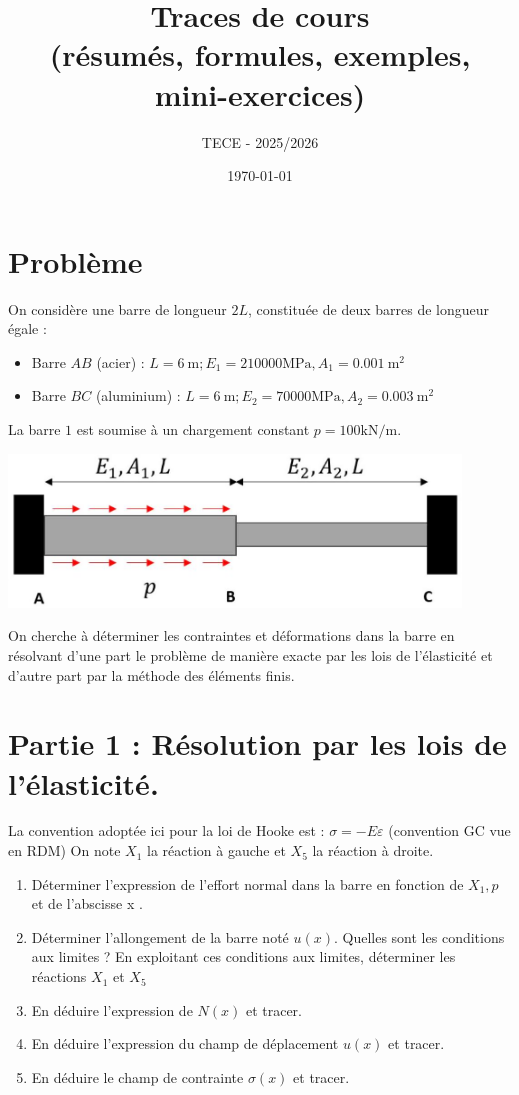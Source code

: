 \documentclass[11pt,a4paper]{report}
\title{\textbf{Traces de cours}\\\large (résumés, formules, exemples, mini-exercices)}
\author{ TECE - 2025/2026 }
\date{\today}
\begin{document}
\captionsetup{singlelinecheck=false}
\section*{Problème}
On considère une barre de longueur $2 L$, constituée de deux barres de longueur égale :

\begin{itemize}
  \item Barre $AB$ (acier) : $L=6 \mathrm{~m} ; E_{1}=210000 \mathrm{MPa}, A_{1}=0.001 \mathrm{~m}^{2}$
  \item Barre $BC$ (aluminium) : $L=6 \mathrm{~m} ; E_{2}=70000 \mathrm{MPa}, A_{2}=0.003 \mathrm{~m}^{2}$
\end{itemize}

La barre $1$ est soumise à un chargement constant $p=100 \mathrm{kN} / \mathrm{m}$.

\begin{center}
\includegraphics[max width=0.9\textwidth, center]{2025_10_03_26e11264345fd9bad5cag-1(2)}
\end{center}

On cherche à déterminer les contraintes et déformations dans la barre en résolvant d'une part le problème de manière exacte par les lois de l'élasticité et d'autre part par la méthode des éléments finis.

\section*{Partie 1 : Résolution par les lois de l'élasticité.}
La convention adoptée ici pour la loi de Hooke est : $\sigma=-E \varepsilon$ (convention GC vue en RDM) On note $X_{1}$ la réaction à gauche et $X_{5}$ la réaction à droite.

\begin{enumerate}
  \item Déterminer l'expression de l'effort normal dans la barre en fonction de $X_{1}, p$ et de l'abscisse x .
  \item Déterminer l'allongement de la barre noté $u(x)$. Quelles sont les conditions aux limites ? En exploitant ces conditions aux limites, déterminer les réactions $X_{1}$ et $X_{5}$
  \item En déduire l'expression de $N(x)$ et tracer.
  \item En déduire l'expression du champ de déplacement $u(x)$ et tracer.
  \item En déduire le champ de contrainte $\sigma(x)$ et tracer.
\end{enumerate}
\end{document}

